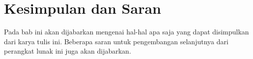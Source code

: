 \chapter{Kesimpulan dan Saran}
\label{chap:kesimpulansaran}

Pada bab ini akan dijabarkan mengenai hal-hal apa saja yang dapat disimpulkan dari karya tulis ini.
Beberapa saran untuk pengembangan selanjutnya dari perangkat lunak ini juga akan dijabarkan.

